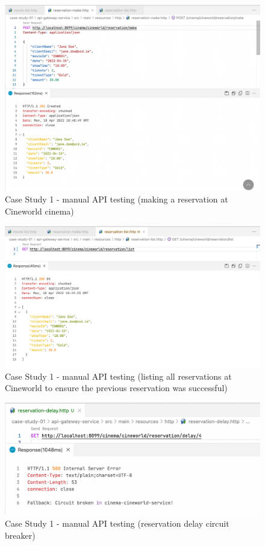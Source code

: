 \begin{figure}[H]
  \centering
  \includegraphics[width=1.0\linewidth]{./assets/images/case-studies/cs01-manual-2.png}
  \caption{Case Study 1 - manual API testing (making a reservation at Cineworld cinema)}
  \label{fig:cs01-manual-2}
\end{figure}

\begin{figure}[H]
  \centering
  \includegraphics[width=1.0\linewidth]{./assets/images/case-studies/cs01-manual-3.png}
  \caption{Case Study 1 - manual API testing (listing all reservations at Cineworld to ensure the previous reservation was successful)}
  \label{fig:cs01-manual-3}
\end{figure}

\begin{figure}[H]
  \centering
  \includegraphics[width=1.0\linewidth]{./assets/images/case-studies/cs01-manual-4.png}
  \caption{Case Study 1 - manual API testing (reservation delay circuit breaker)}
  \label{fig:cs01-manual-4}
\end{figure}

